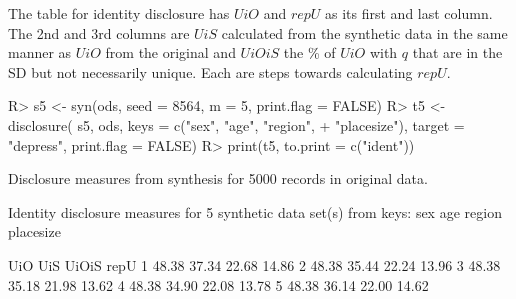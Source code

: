 \documentclass[12pt]{article}
\renewcommand{\baselinestretch}{1.5} %
\begin{document}
The table for identity disclosure has $UiO$ and $repU$ as its first and last column. The 2nd and 3rd columns are $UiS$ calculated from the synthetic data in the same manner as $UiO$ from the original and $UiOiS$ the \% of $UiO$ with $q$ that are in the SD but not necessarily unique. Each are steps towards calculating $repU$.
\renewcommand{\baselinestretch}{1.0}
\begin{Schunk}
\begin{Sinput}
R> s5 <- syn(ods, seed = 8564, m = 5, print.flag = FALSE)
R> t5 <- disclosure( s5, ods, keys = c("sex", "age", "region",
+    "placesize"), target = "depress", print.flag = FALSE)
R> print(t5, to.print = c("ident"))
\end{Sinput}
\begin{Soutput}
Disclosure measures from synthesis for 5000 records in original data.

Identity disclosure measures for 5 synthetic data set(s) from keys:
 sex age region placesize 

    UiO   UiS UiOiS  repU
1 48.38 37.34 22.68 14.86
2 48.38 35.44 22.24 13.96
3 48.38 35.18 21.98 13.62
4 48.38 34.90 22.08 13.78
5 48.38 36.14 22.00 14.62
\end{Soutput}
\end{Schunk}
\renewcommand{\baselinestretch}{1.5}
\end{document}

